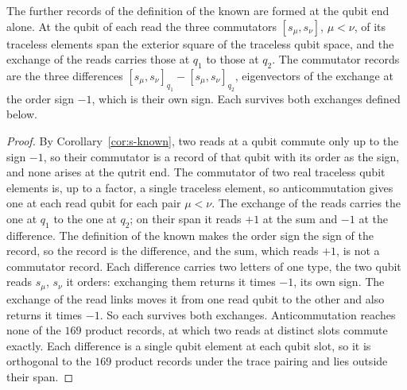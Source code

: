 \begin{theorem}
\label{thm:s-further}
The further records of the definition of the known are formed at the qubit end alone. At the qubit of each read the three commutators $[s_{\mu},s_{\nu}]$, $\mu<\nu$, of its traceless elements span the exterior square of the traceless qubit space, and the exchange of the reads carries those at $q_{1}$ to those at $q_{2}$. The commutator records are the three differences $[s_{\mu},s_{\nu}]_{q_{1}}-[s_{\mu},s_{\nu}]_{q_{2}}$, eigenvectors of the exchange at the order sign $-1$, which is their own sign. Each survives both exchanges defined below.
\end{theorem}
\begin{proof}
By Corollary~\ref{cor:s-known}, two reads at a qubit commute only up to the sign $-1$, so their commutator is a record of that qubit with its order as the sign, and none arises at the qutrit end. The commutator of two real traceless qubit elements is, up to a factor, a single traceless element, so anticommutation gives one at each read qubit for each pair $\mu<\nu$. The exchange of the reads carries the one at $q_{1}$ to the one at $q_{2}$; on their span it reads $+1$ at the sum and $-1$ at the difference. The definition of the known makes the order sign the sign of the record, so the record is the difference, and the sum, which reads $+1$, is not a commutator record. Each difference carries two letters of one type, the two qubit reads $s_{\mu}$, $s_{\nu}$ it orders: exchanging them returns it times $-1$, its own sign. The exchange of the read links moves it from one read qubit to the other and also returns it times $-1$. So each survives both exchanges. Anticommutation reaches none of the $169$ product records, at which two reads at distinct slots commute exactly. Each difference is a single qubit element at each qubit slot, so it is orthogonal to the $169$ product records under the trace pairing and lies outside their span.
\end{proof}

